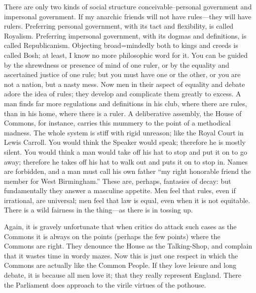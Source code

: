 \documentclass{book}
\begin{document}
There are only two kinds of social structure conceivable–personal government and impersonal government. If my anarchic friends will not have rules—they will have rulers. Preferring personal government, with its tact and flexibility, is called Royalism. Preferring impersonal government, with its dogmas and definitions, is called Republicanism. Objecting broad=mindedly both to kings and creeds is called Bosh; at least, I know no more philosophic word for it. You can be guided by the shrewdness or presence of mind of one ruler, or by the equality and ascertained justice of one rule; but you must have one or the other, or you are not a nation, but a nasty mess. Now men in their aspect of equality and debate adore the idea of rules; they develop and complicate them greatly to excess. A man finds far more regulations and definitions in his club, where there are rules, than in his home, where there is a ruler. A deliberative assembly, the House of Commons, for instance, carries this mummery to the point of a methodical madness. The whole system is stiff with rigid unreason; like the Royal Court in Lewis Carroll. You would think the Speaker would speak; therefore he is mostly silent. You would think a man would take off his hat to stop and put it on to go away; therefore he takes off his hat to walk out and puts it on to stop in. Names are forbidden, and a man must call his own father “my right honorable friend the member for West Birmingham.” These are, perhaps, fantasies of decay: but fundamentally they answer a masculine appetite. Men feel that rules, even if irrational, are universal; men feel that law is equal, even when it is not equitable. There is a wild fairness in the thing—as there is in tossing up.

Again, it is gravely unfortunate that when critics do attack such cases as the Commons it is always on the points (perhaps the few points) where the Commons are right. They denounce the House as the Talking-Shop, and complain that it wastes time in wordy mazes. Now this is just one respect in which the Commons are actually like the Common People. If they love leisure and long debate, it is because all men love it; that they really represent England. There the Parliament does approach to the virile virtues of the pothouse.
\end{document}
